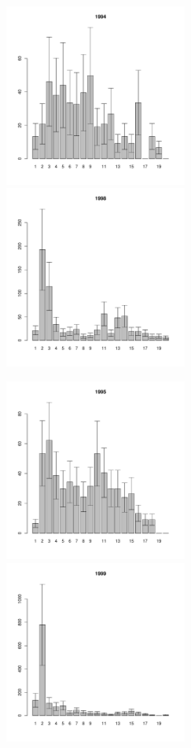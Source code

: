 \documentclass[12pt, a4paper]{article}
\begin{document}
\begin{figure}[h]
\begin{multicols}{3}
\hfill
\includegraphics[width=60mm]{../White_Sea/Luvenga_II_razrez/low_beatch_1994_.pdf}
\hfill
\includegraphics[width=60mm]{../White_Sea/Luvenga_II_razrez/low_beatch_1998_.pdf}

\end{multicols}


\begin{multicols}{3}
\hfill
\includegraphics[width=60mm]{../White_Sea/Luvenga_II_razrez/low_beatch_1995_.pdf}
\hfill
\includegraphics[width=60mm]{../White_Sea/Luvenga_II_razrez/low_beatch_1999_.pdf}


\end{multicols}
\end{figure}
\end{document}
